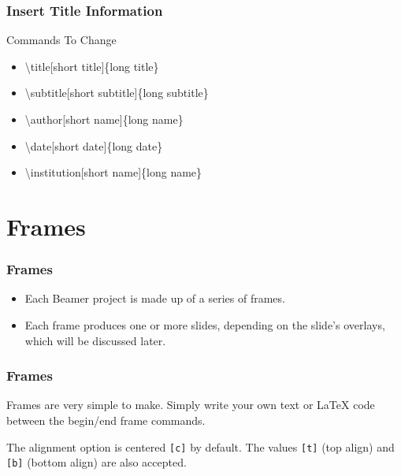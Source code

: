 \documentclass[aspectratio=169,utf8]{ctexbeamer}
\begin{document}
\begin{frame}
  \frametitle{Insert Title Information}

  \begin{block}{Commands To Change}
    \tt
    \begin{itemize}
      \item
        \textbackslash{}title[\alert{short title}]\{\alert{long title}\}
      \item
        \textbackslash{}subtitle[\alert{short subtitle}]\{\alert{long subtitle}\}
      \item
        \textbackslash{}author[\alert{short name}]\{\alert{long name}\}
      \item
        \textbackslash{}date[\alert{short date}]\{\alert{long date}\}
      \item
        \textbackslash{}institution[\alert{short name}]\{\alert{long name}\}
    \end{itemize}
  \end{block}
    
\end{frame}

\section{Frames}
\begin{frame}
  \frametitle{Frames}

  \begin{itemize}
    \setlength{\itemsep}{8pt}
    \item Each Beamer project is made up of a series of frames.
    \item Each frame produces one or more slides, depending on the slide’s overlays, which will be discussed later.
  \end{itemize}

      
\end{frame}


\begin{frame}
  \frametitle{Frames}

  Frames are very simple to make. Simply write your own text or \LaTeX{} code between the begin/end frame commands.

  The alignment option is centered {\tt [c]} by default. The values {\tt [t]} (top align) and {\tt [b]} (bottom align) are also accepted.


\end{frame}
\end{document}
